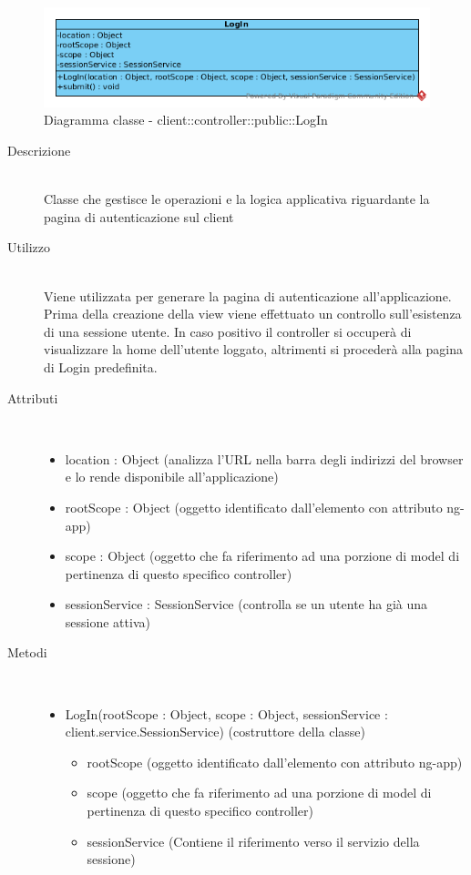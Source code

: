 \begin{center}
			\begin{figure}[H]
				\centering \includegraphics[scale=4, max width=\textwidth, max height=\myheight]{../img/diagrammiClassi/client/controller/public/LogIn.png}
				\caption{Diagramma classe - client::controller::public::LogIn}
			\end{figure}
		\end{center}\begin{description}
\item[Descrizione] \hfill \\
 Classe che gestisce le operazioni e la logica applicativa riguardante la pagina di autenticazione sul client
\item[Utilizzo] \hfill \\
 Viene utilizzata per generare la pagina di autenticazione all’applicazione. Prima della creazione della view viene effettuato un controllo sull’esistenza di una sessione utente. In caso positivo il controller si occuperà di visualizzare la home dell'utente loggato, altrimenti si procederà alla pagina di Login predefinita.
\item[Attributi] \hfill \\
 \vspace{-7mm}
\begin{itemize}
\item location : Object (analizza l'URL nella barra degli indirizzi del browser e lo rende disponibile all'applicazione)
\item rootScope : Object (oggetto identificato dall’elemento con attributo ng-app)
\item scope : Object (oggetto che fa riferimento ad una porzione di model di pertinenza di questo specifico controller)
\item sessionService : SessionService (controlla se un utente ha già una sessione attiva)
\end{itemize}

\item[Metodi] \hfill \\
 \vspace{-7mm}
\begin{itemize}
\item LogIn(rootScope : Object, scope : Object, sessionService : client.service.SessionService) (costruttore della classe)\begin{itemize}
\item rootScope (oggetto identificato dall’elemento con attributo ng-app)
\item scope (oggetto che fa riferimento ad una porzione di model di pertinenza di questo specifico controller)
\item sessionService (Contiene il riferimento verso il servizio della sessione)
\end{itemize}


\end{itemize}
\end{description}
